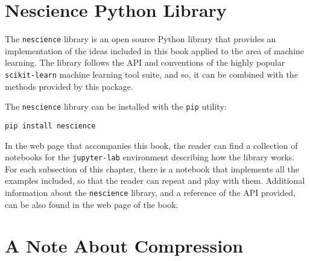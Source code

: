 %
%

\section{Nescience Python Library}
\label{sec:nescience_library}

The \texttt{nescience} library is an open source Python library that provides an implementation of the ideas included in this book applied to the area of machine learning. The library follows the API and conventions of the highly popular \texttt{scikit-learn} machine learning tool suite, and so, it can be combined with the methods provided by this package.

The \texttt{nescience} library can be installed with the \texttt{pip} utility:

\begin{sourcecode}
{\scriptsize \begin{verbatim}
pip install nescience
\end{verbatim}}
\end{sourcecode}

In the web page that accompanies this book, the reader can find a collection of notebooks for the \texttt{jupyter-lab} environment describing how the library works. For each subsection of this chapter, there is a notebook that implements all the examples included, so that the reader can repeat and play with them. Additional information about the \texttt{nescience} library, and a reference of the API provided, can be also found in the web page of the book.

%
%
\section{A Note About Compression}
\label{sec:note_about_compression}

